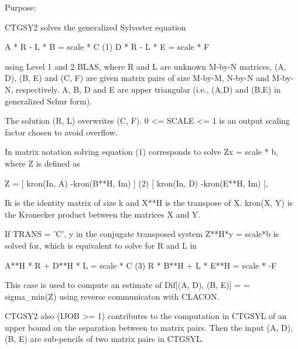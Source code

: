  \begin{DoxyParagraph}{Purpose\+: }
\begin{DoxyVerb} CTGSY2 solves the generalized Sylvester equation

             A * R - L * B = scale *  C               (1)
             D * R - L * E = scale * F

 using Level 1 and 2 BLAS, where R and L are unknown M-by-N matrices,
 (A, D), (B, E) and (C, F) are given matrix pairs of size M-by-M,
 N-by-N and M-by-N, respectively. A, B, D and E are upper triangular
 (i.e., (A,D) and (B,E) in generalized Schur form).

 The solution (R, L) overwrites (C, F). 0 <= SCALE <= 1 is an output
 scaling factor chosen to avoid overflow.

 In matrix notation solving equation (1) corresponds to solve
 Zx = scale * b, where Z is defined as

        Z = [ kron(In, A)  -kron(B**H, Im) ]             (2)
            [ kron(In, D)  -kron(E**H, Im) ],

 Ik is the identity matrix of size k and X**H is the transpose of X.
 kron(X, Y) is the Kronecker product between the matrices X and Y.

 If TRANS = 'C', y in the conjugate transposed system Z**H*y = scale*b
 is solved for, which is equivalent to solve for R and L in

             A**H * R  + D**H * L   = scale * C           (3)
             R  * B**H + L  * E**H  = scale * -F

 This case is used to compute an estimate of Dif[(A, D), (B, E)] =
 = sigma_min(Z) using reverse communicaton with CLACON.

 CTGSY2 also (IJOB >= 1) contributes to the computation in CTGSYL
 of an upper bound on the separation between to matrix pairs. Then
 the input (A, D), (B, E) are sub-pencils of two matrix pairs in
 CTGSYL.\end{DoxyVerb}
 
\end{DoxyParagraph}

